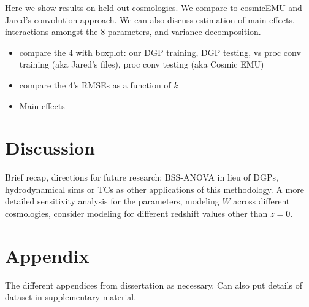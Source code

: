 \documentclass[11pt]{article}
\begin{document}
Here we show results on held-out cosmologies.  We compare to cosmicEMU and Jared's convolution approach. We can also discuss estimation of main effects, interactions amongst the 8 parameters, and variance decomposition.

\begin{itemize}
    \item compare the 4 with boxplot: our DGP training, DGP testing, vs proc conv training (aka Jared's files), proc conv testing (aka Cosmic EMU)
    \item compare the 4's RMSEs as a function of $k$
    \item Main effects
\end{itemize}

\section{Discussion}
\label{sec:disc}

Brief recap, directions for future research: BSS-ANOVA in lieu of DGPs, hydrodynamical sims or TCs as other applications of this methodology. A more detailed sensitivity analysis for the parameters, modeling $W$ across different cosmologies, consider modeling for different redshift values other than $z=0$.

\section{Appendix}
\label{sec:apdx}

The different appendices from dissertation as necessary. Can also put details of dataset in supplementary material.



\end{document}
